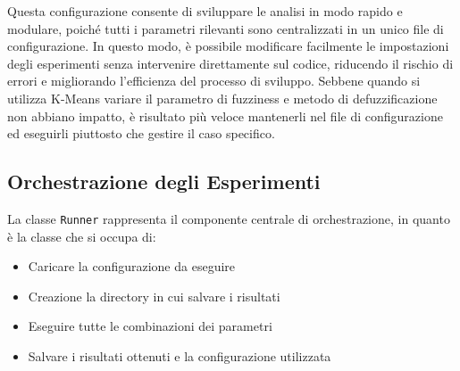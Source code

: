 Questa configurazione consente di sviluppare le analisi in modo rapido e modulare, poiché tutti i parametri rilevanti sono centralizzati in un unico file di configurazione. In questo modo, è possibile modificare facilmente le impostazioni degli esperimenti senza intervenire direttamente sul codice, riducendo il rischio di errori e migliorando l’efficienza del processo di sviluppo.
Sebbene quando si utilizza K-Means variare il parametro di fuzziness e metodo di defuzzificazione non abbiano impatto, è risultato più veloce mantenerli nel file di configurazione ed eseguirli piuttosto che gestire il caso specifico.


\subsection{Orchestrazione degli Esperimenti}

La classe \texttt{Runner} rappresenta il componente centrale di orchestrazione, in quanto è la classe che si occupa di:
\begin{itemize}
    \item Caricare la configurazione da eseguire
    \item Creazione la directory in cui salvare i risultati
    \item Eseguire tutte le combinazioni dei parametri
    \item Salvare i risultati ottenuti e la configurazione utilizzata
\end{itemize}


